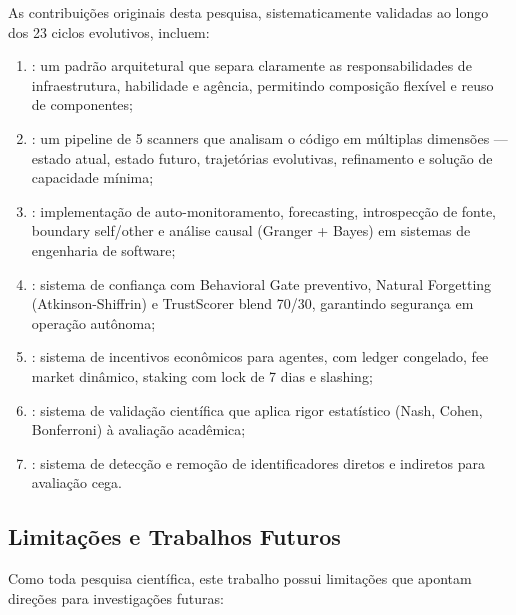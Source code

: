 As contribuições originais desta pesquisa, sistematicamente validadas ao
longo dos 23 ciclos evolutivos, incluem:

\begin{enumerate}
\item {}: um padrão
      arquitetural que separa claramente as responsabilidades de
      infraestrutura, habilidade e agência, permitindo composição flexível
      e reuso de componentes;
\item {}: um pipeline de 5 scanners que analisam o código
      em múltiplas dimensões --- estado atual, estado futuro, trajetórias
      evolutivas, refinamento e solução de capacidade mínima;
\item {}: implementação de
      auto-monitoramento, forecasting, introspecção de fonte, boundary
      self/other e análise causal (Granger + Bayes) em sistemas de
      engenharia de software;
\item {}: sistema de confiança com
      Behavioral Gate preventivo, Natural Forgetting (Atkinson-Shiffrin)
      e TrustScorer blend 70/30, garantindo segurança em operação autônoma;
\item {}: sistema de incentivos
      econômicos para agentes, com ledger congelado, fee market dinâmico,
      staking com lock de 7 dias e slashing;
\item {}: sistema de validação
      científica que aplica rigor estatístico (Nash, Cohen, Bonferroni)
      à avaliação acadêmica;
\item {}: sistema de detecção e remoção de
      identificadores diretos e indiretos para avaliação cega.
\end{enumerate}

\subsection{Limitações e Trabalhos Futuros}

Como toda pesquisa científica, este trabalho possui limitações que apontam
direções para investigações futuras:

